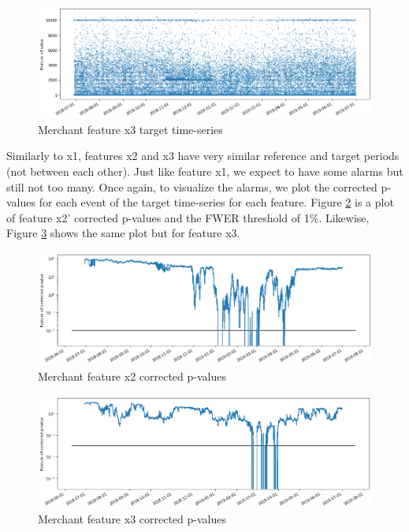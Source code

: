 \begin{figure}[!htb]
    \begin{center}
      \includegraphics[scale=0.5]{figures/merchant-x3-target.png}
      \caption{Merchant feature x3 target time-series}
      \label{fig:merchant-x3-target}
    \end{center}
\end{figure}
\clearpage
Similarly to x1, features x2 and x3 have very similar reference and target periods (not between each other). Just like feature x1, we expect to have some alarms but still not too many. Once again, to visualize the alarms, we plot the corrected p-values for each event of the target time-series for each feature. Figure \ref{fig:merchant-x2-correctedpvalues} is a plot of feature x2' corrected p-values and the FWER threshold of 1\%. Likewise, Figure \ref{fig:merchant-x3-correctedpvalues} shows the same plot but for feature x3.
\begin{figure}[!htb]
    \begin{center}
      \includegraphics[scale=0.5]{figures/merchant-x2-correctedpvalues.png}
      \caption{Merchant feature x2 corrected p-values}
      \label{fig:merchant-x2-correctedpvalues}
    \end{center}
\end{figure}
\begin{figure}[!htb]
    \begin{center}
      \includegraphics[scale=0.5]{figures/merchant-x3-correctedpvalues.png}
      \caption{Merchant feature x3 corrected p-values}
      \label{fig:merchant-x3-correctedpvalues}
    \end{center}
\end{figure}

